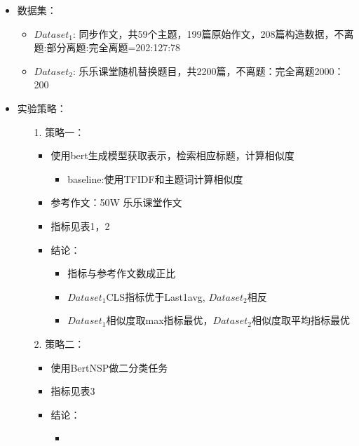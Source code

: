 \documentclass[11pt]{article}
\begin{document}
\begin{CJK}{UTF8}{gkai}
\begin{itemize}
  \item 数据集：
  \begin{itemize}
    \item $Dataset_1$: 同步作文，共59个主题，199篇原始作文，208篇构造数据，不离题:部分离题:完全离题=202:127:78
    \item $Dataset_2$: 乐乐课堂随机替换题目，共2200篇，不离题：完全离题2000：200
  \end{itemize}
  \item 实验策略：
  \begin{itemize}
    \item [1.] 策略一：
    \begin{itemize}
      \item 使用bert生成模型获取表示，检索相应标题，计算相似度
      \begin{itemize}
        \item baseline:使用TFIDF和主题词计算相似度
      \end{itemize}
    \end{itemize} 
    \begin{itemize}
      \item 参考作文：50W 乐乐课堂作文
      \item 指标见表1，2
      \item 结论：
      \begin{itemize}
        \item 指标与参考作文数成正比
        \item $Dataset_1$CLS指标优于Last1avg, $Dataset_2$相反
        \item $Dataset_1$相似度取max指标最优，$Dataset_2$相似度取平均指标最优
      \end{itemize}
    \end{itemize}
    \item [2.] 策略二：
    \begin{itemize}
      \item 使用BertNSP做二分类任务
      \item 指标见表3
      \item 结论：
      \begin{itemize}
        \item 
      \end{itemize}
    \end{itemize}
  \end{itemize}
\end{itemize}


\end{CJK}
\end{document}
